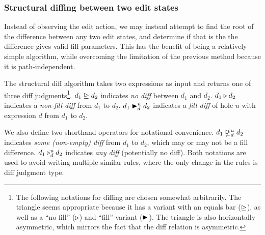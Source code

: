 \subsubsection{Structural diffing between two edit states}
\label{sec:far-detect-structural-diff}

Instead of observing the edit action, we may instead attempt to find the root of the difference between any two edit states, and determine if that is the the difference gives valid fill parameters. This has the benefit of being a relatively simple algorithm, while overcoming the limitation of the previous method because it is path-independent.

The structural diff algorithm takes two expressions as input and returns one of three diff judgments\footnote{The following notations for diffing are chosen somewhat arbitrarily. The triangle seems appropriate because it has a variant with an equals bar ($\nodiff{}{}$), as well as a ``no fill'' ($\nfdiff{}{}{}{}$) and ``fill'' variant ($\fdiff{}{}{}{}$). The triangle is also horizontally asymmetric, which mirrors the fact that the diff relation is asymmetric.}. $\nodiff{d_1}{d_2}$ indicates \textit{no diff} between $d_1$ and $d_2$. $\nfdiff{d_1}{d_2}$ indicates a \textit{non-fill diff} from $d_1$ to $d_2$. $\fdiff{d_1}{d_2}{u}{d}$ indicates a \textit{fill diff} of hole $u$ with expression $d$ from $d_1$ to $d_2$.

We also define two shorthand operators for notational convenience. $\sdiff{d_1}{d_2}{u}{d}$ indicates \textit{some (non-empty) diff} from $d_1$ to $d_2$, which may or may not be a fill difference. $\adiff{d_1}{d_2}{u}{d}$ indicates \textit{any diff} (potentially no diff). Both notations are used to avoid writing multiple similar rules, where the only change in the rules is diff judgment type.


